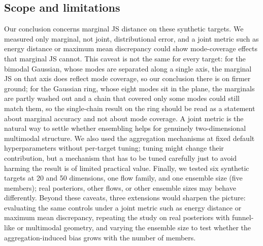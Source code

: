 \documentclass[11pt]{article}
\begin{document}
\subsection{Scope and limitations}
Our conclusion concerns marginal JS distance on these synthetic targets. We
measured only marginal, not joint, distributional error, and a joint metric
such as energy distance or maximum mean discrepancy could show mode-coverage
effects that marginal JS cannot. This caveat is not the same for every target:
for the bimodal Gaussian, whose modes are separated along a single axis, the
marginal JS on that axis does reflect mode coverage, so our conclusion there is
on firmer ground; for the Gaussian ring, whose eight modes sit in the plane,
the marginals are partly washed out and a chain that covered only some modes
could still match them, so the single-chain result on the ring should be read
as a statement about marginal accuracy and not about mode coverage. A joint
metric is the natural way to settle whether ensembling helps for genuinely
two-dimensional multimodal structure. We also used the aggregation mechanisms
at fixed default hyperparameters without per-target tuning; tuning might change
their contribution, but a mechanism that has to be tuned carefully just to
avoid harming the result is of limited practical value. Finally, we tested six
synthetic targets at 20 and 50 dimensions, one flow family, and one ensemble
size (five members); real posteriors, other flows, or other ensemble sizes may
behave differently. Beyond these caveats, three extensions would sharpen the
picture: evaluating the same controls under a joint metric such as energy
distance or maximum mean discrepancy, repeating the study on real posteriors
with funnel-like or multimodal geometry, and varying the ensemble size to test
whether the aggregation-induced bias grows with the number of members.
\end{document}
